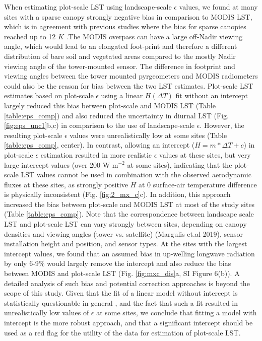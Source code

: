 \documentclass[fleqn,10pt]{wlscirep}
\begin{document}
When estimating plot-scale LST using landscape-scale $\epsilon$ values, we found at many sites with a sparse canopy strongly negative bias in comparison to MODIS LST, which is in agreement with previous studies where the bias for sparse canopies reached up to 12 $K$ \cite{guillevic2018land}.The MODIS overpass can have a large off-Nadir viewing angle, which would lead to an elongated foot-print\cite{margulis2019joint} and therefore a different distribution of bare soil and vegetated areas compared to the mostly Nadir viewing angle of the tower-mounted sensor. The difference in footprint and viewing angles between the tower mounted pyrgeometers and MODIS radiometers could also be the reason for bias between the two LST estimates. Plot-scale LST estimates based on plot-scale $\epsilon$ using a linear $H(\Delta T)$ fit without an intercept largely reduced this bias between plot-scale and MODIS LST (Table \ref{table:eps_comp}) and also reduced the uncertainty in diurnal LST (Fig. \ref{fig:eps_unc1}b,c) in comparison to the use of landscape-scale $\epsilon$. However, the resulting plot-scale $\epsilon$ values were unrealistically low at some sites (Table \ref{table:eps_comp}, center). In contrast, allowing an intercept ($H=m*\Delta T + c$) in plot-scale $\epsilon$ estimation resulted in more realistic $\epsilon$ values at these sites, but very large intercept values (over 200 W m$^{-2}$ at some sites), indicating that the plot-scale LST values cannot be used in combination with the observed aerodynamic fluxes at these sites, as strongly positive $H$ at 0 surface-air temperature difference is physically inconsistent (Fig. \ref{fig:2_mx_c}c). In addition, this approach increased the bias between plot-scale and MODIS LST at most of the study sites (Table \ref{table:eps_comp}). Note that the correspondence between landscape scale LST and plot-scale LST can vary strongly between sites,  depending on canopy densities and viewing angles (tower vs. satellite) (Margulis et.al 2019), sensor installation height and position, and sensor types\cite{marcolla2018geometry}. At the sites with the largest intercept values, we found that an assumed bias in up-welling longwave radiation by only 6-9\% would largely remove the intercept and also reduce the bias between MODIS and plot-scale LST (Fig. \ref{fig:mxc_dis}a, SI Figure 6(b)). A detailed analysis of such bias and potential correction approaches is beyond the scope of this study. Given that the fit of a linear model without intercept is statistically questionable in general \cite{eisenhauer2003regression}, and the fact that such a fit resulted in unrealistically low values of $\epsilon$ at some sites, we conclude that fitting a model with intercept is the more robust approach, and that a significant intercept should be used as a red flag for the utility of the data for estimation of plot-scale LST. 
\end{document}
